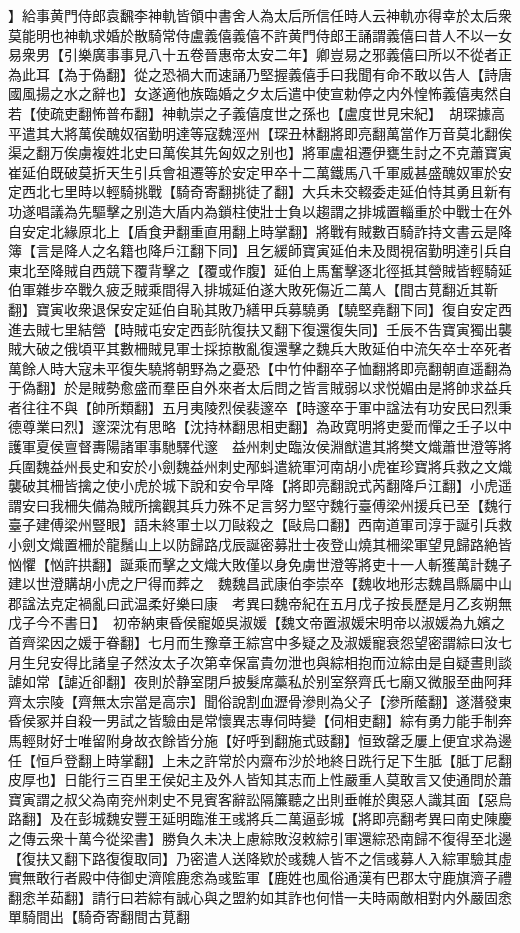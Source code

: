 】給事黄門侍郎袁飜李神軌皆領中書舍人為太后所信任時人云神軌亦得幸於太后衆莫能明也神軌求婚於散騎常侍盧義僖義僖不許黄門侍郎王誦謂義僖曰昔人不以一女易衆男【引樂廣事事見八十五卷晉惠帝太安二年】卿豈易之邪義僖曰所以不從者正為此耳【為于偽翻】從之恐禍大而速誦乃堅握義僖手曰我聞有命不敢以告人【詩唐國風揚之水之辭也】女遂適他族臨婚之夕太后遣中使宣勅停之内外惶怖義僖夷然自若【使疏吏翻怖普布翻】神軌崇之子義僖度世之孫也【盧度世見宋紀】　胡琛據高平遣其大將萬俟醜奴宿勤明達等寇魏涇州【琛丑林翻將即亮翻萬當作万音莫北翻俟渠之翻万俟虜複姓北史曰萬俟其先匈奴之别也】將軍盧祖遷伊甕生討之不克蕭寶寅崔延伯既破莫折天生引兵會祖遷等於安定甲卒十二萬鐵馬八千軍威甚盛醜奴軍於安定西北七里時以輕騎挑戰【騎奇寄翻挑徒了翻】大兵未交輟委走延伯恃其勇且新有功遂唱議為先驅擊之别造大盾内為鎖柱使壯士負以趨謂之排城置輜重於中戰士在外自安定北緣原北上【盾食尹翻重直用翻上時掌翻】將戰有賊數百騎詐持文書云是降簿【言是降人之名籍也降戶江翻下同】且乞緩師寶寅延伯未及閲視宿勤明達引兵自東北至降賊自西競下覆背擊之【覆或作腹】延伯上馬奮擊逐北徑抵其營賊皆輕騎延伯軍雜步卒戰久疲乏賊乘間得入排城延伯遂大敗死傷近二萬人【間古莧翻近其靳翻】寶寅收衆退保安定延伯自恥其敗乃繕甲兵募驍勇【驍堅堯翻下同】復自安定西進去賊七里結營【時賊屯安定西彭阬復扶又翻下復還復失同】壬辰不告寶寅獨出襲賊大破之俄頃平其數柵賊見軍士採掠散亂復還擊之魏兵大敗延伯中流矢卒士卒死者萬餘人時大寇未平復失驍將朝野為之憂恐【中竹仲翻卒子恤翻將即亮翻朝直遥翻為于偽翻】於是賊勢愈盛而羣臣自外來者太后問之皆言賊弱以求悦媚由是將帥求益兵者往往不與【帥所類翻】五月夷陵烈侯裴邃卒【時邃卒于軍中諡法有功安民曰烈秉德尊業曰烈】邃深沈有思略【沈持林翻思相吏翻】為政寛明將吏愛而憚之壬子以中護軍夏侯亶督夀陽諸軍事馳驛代邃　益州刺史臨汝侯淵猷遣其將樊文熾蕭世澄等將兵圍魏益州長史和安於小劍魏益州刺史邴蚪遣統軍河南胡小虎崔珍寶將兵救之文熾襲破其柵皆擒之使小虎於城下說和安令早降【將即亮翻說式芮翻降戶江翻】小虎遥謂安曰我柵失備為賊所擒觀其兵力殊不足言努力堅守魏行臺傅梁州援兵已至【魏行臺子建傅梁州豎眼】語未終軍士以刀敺殺之【敺烏口翻】西南道軍司淳于誕引兵救小劍文熾置柵於龍鬚山上以防歸路戊辰誕密募壯士夜登山燒其柵梁軍望見歸路絶皆忷懼【忷許拱翻】誕乘而擊之文熾大敗僅以身免虜世澄等將吏十一人斬獲萬計魏子建以世澄購胡小虎之尸得而葬之　魏魏昌武康伯李崇卒【魏收地形志魏昌縣屬中山郡諡法克定禍亂曰武温柔好樂曰康　考異曰魏帝紀在五月戊子按長歷是月乙亥朔無戊子今不書日】　初帝納東昏侯寵姬吳淑媛【魏文帝置淑媛宋明帝以淑媛為九嬪之首齊梁因之媛于眷翻】七月而生豫章王綜宫中多疑之及淑媛寵衰怨望密謂綜曰汝七月生兒安得比諸皇子然汝太子次第幸保富貴勿泄也與綜相抱而泣綜由是自疑晝則談謔如常【謔近卻翻】夜則於静室閉戶披髮席藁私於别室祭齊氏七廟又微服至曲阿拜齊太宗陵【齊無太宗當是高宗】聞俗說割血瀝骨滲則為父子【滲所䕃翻】遂潛發東昏侯冢并自殺一男試之皆驗由是常懷異志專伺時變【伺相吏翻】綜有勇力能手制奔馬輕財好士唯留附身故衣餘皆分施【好呼到翻施式豉翻】恒致罄乏屢上便宜求為邊任【恒戶登翻上時掌翻】上未之許常於内齋布沙於地終日跣行足下生胝【胝丁尼翻皮厚也】日能行三百里王侯妃主及外人皆知其志而上性嚴重人莫敢言又使通問於蕭寶寅謂之叔父為南兖州刺史不見賓客辭訟隔簾聽之出則垂帷於輿惡人識其面【惡烏路翻】及在彭城魏安豐王延明臨淮王彧將兵二萬逼彭城【將即亮翻考異曰南史陳慶之傳云衆十萬今從梁書】勝負久未决上慮綜敗沒敕綜引軍還綜恐南歸不復得至北邊【復扶又翻下路復復取同】乃密遣人送降欵於彧魏人皆不之信彧募人入綜軍驗其虛實無敢行者殿中侍御史濟隂鹿悆為彧監軍【鹿姓也風俗通漢有巴郡太守鹿旗濟子禮翻悆羊茹翻】請行曰若綜有誠心與之盟約如其詐也何惜一夫時兩敵相對内外嚴固悆單騎間出【騎奇寄翻間古莧翻